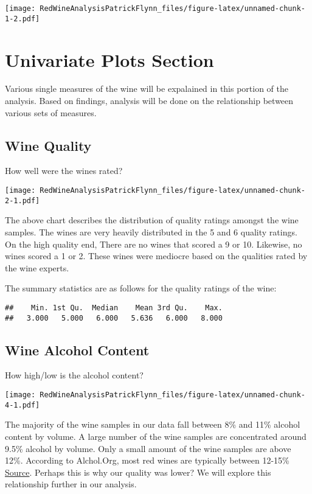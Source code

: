 \documentclass[]{article}
\begin{document}
\texttt{[image: RedWineAnalysisPatrickFlynn\_files/figure-latex/unnamed-chunk-1-2.pdf]}

\hypertarget{univariate-plots-section}{%
\section{Univariate Plots Section}\label{univariate-plots-section}}

Various single measures of the wine will be expalained in this portion
of the analysis. Based on findings, analysis will be done on the
relationship between various sets of measures.

\hypertarget{wine-quality}{%
\subsection{Wine Quality}\label{wine-quality}}

How well were the wines rated?

\texttt{[image: RedWineAnalysisPatrickFlynn\_files/figure-latex/unnamed-chunk-2-1.pdf]}

The above chart describes the distribution of quality ratings amongst
the wine samples. The wines are very heavily distributed in the 5 and 6
quality ratings. On the high quality end, There are no wines that scored
a 9 or 10. Likewise, no wines scored a 1 or 2. These wines were mediocre
based on the qualities rated by the wine experts.

The summary statistics are as follows for the quality ratings of the
wine:

\begin{verbatim}
##    Min. 1st Qu.  Median    Mean 3rd Qu.    Max. 
##   3.000   5.000   6.000   5.636   6.000   8.000
\end{verbatim}

\hypertarget{wine-alcohol-content}{%
\subsection{Wine Alcohol Content}\label{wine-alcohol-content}}

How high/low is the alcohol content?

\texttt{[image: RedWineAnalysisPatrickFlynn\_files/figure-latex/unnamed-chunk-4-1.pdf]}

The majority of the wine samples in our data fall between 8\% and 11\%
alcohol content by volume. A large number of the wine samples are
concentrated around 9.5\% alcohol by volume. Only a small amount of the
wine samples are above 12\%. According to Alchol.Org, most red wines are
typically between 12-15\%
\href{https://www.alcohol.org/statistics-information/abv/}{Source}.
Perhaps this is why our quality was lower? We will explore this
relationship further in our analysis.
\end{document}
